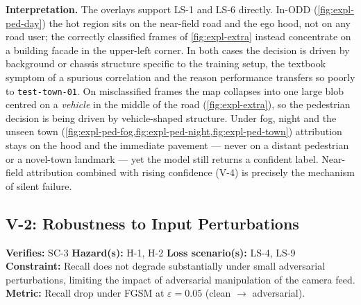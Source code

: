 \documentclass[a4paper,12pt]{article}
\begin{document}
\noindent\textbf{Interpretation.} The overlays support LS-1 and LS-6 directly. In-ODD
(\cref{fig:expl-ped-day}) the hot region sits on the near-field road and the ego hood,
not on any road user; the correctly classified frames of \cref{fig:expl-extra} instead
concentrate on a building facade in the upper-left corner. In both cases the decision is
driven by background or chassis structure specific to the training setup, the textbook
symptom of a spurious correlation and the reason performance transfers so poorly to
\texttt{test-town-01}. On misclassified frames the map collapses into one large blob
centred on a \emph{vehicle} in the middle of the road (\cref{fig:expl-extra}), so the
pedestrian decision is being driven by vehicle-shaped structure. Under fog, night and the
unseen town (\cref{fig:expl-ped-fog,fig:expl-ped-night,fig:expl-ped-town}) attribution
stays on the hood and the immediate pavement --- never on a distant pedestrian or a
novel-town landmark --- yet the model still returns a confident label. Near-field
attribution combined with rising confidence (V-4) is precisely the mechanism of silent
failure.


\subsection{V-2: Robustness to Input Perturbations}

\begin{mdframed}[style=subclaim]
\textbf{Verifies:} SC-3 \quad \textbf{Hazard(s):} H-1, H-2 \quad
\textbf{Loss scenario(s):} LS-4, LS-9\\
\textbf{Constraint:} Recall does not degrade substantially under small adversarial
perturbations, limiting the impact of adversarial manipulation of the camera feed.\\
\textbf{Metric:} Recall drop under FGSM at $\varepsilon = 0.05$ (clean $\to$ adversarial).
\end{mdframed}
\end{document}

